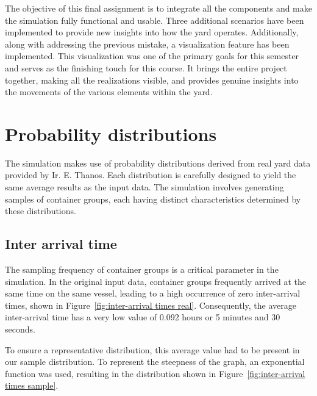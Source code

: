 \documentclass{article}
\begin{document}
The objective of this final assignment is to integrate all the components and
make the simulation fully functional and usable. Three additional scenarios
have been implemented to provide new insights into how the yard operates.
Additionally, along with addressing the previous mistake, a visualization
feature has been implemented. This visualization was one of the primary goals
for this semester and serves as the finishing touch for this course. It brings
the entire project together, making all the realizations visible, and provides
genuine insights into the movements of the various elements within the yard.

\section{Probability distributions}
The simulation makes use of probability distributions derived from real yard
data provided by Ir. E. Thanos. Each distribution is carefully designed to
yield the same average results as the input data. The simulation involves
generating samples of container groups, each having distinct characteristics
determined by these distributions.

\subsection{Inter arrival time}
The sampling frequency of container groups is a critical parameter in the
simulation. In the original input data, container groups frequently arrived at
the same time on the same vessel, leading to a high occurrence of zero
inter-arrival times, shown in Figure~\ref{fig:inter-arrival times real}.
Consequently, the average inter-arrival time has a very low value of 0.092
hours or 5 minutes and 30 seconds.

To ensure a representative distribution, this average value had to be present
in our sample distribution. To represent the steepness of the graph, an
exponential function was used, resulting in the distribution shown in
Figure~\ref{fig:inter-arrival times sample}.
\end{document}
